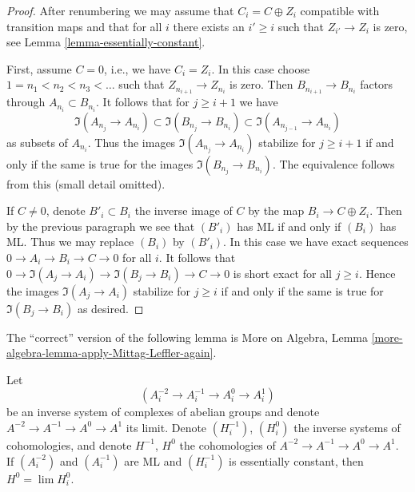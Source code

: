 \begin{proof}
After renumbering we may assume that $C_i = C \oplus Z_i$ compatible with
transition maps and that for all $i$ there exists an $i' \geq i$ such that
$Z_{i'} \to Z_i$ is zero, see Lemma \ref{lemma-essentially-constant}.

\medskip\noindent
First, assume $C = 0$, i.e., we have $C_i = Z_i$.
In this case choose $1 = n_1 < n_2 < n_3 < \ldots$
such that $Z_{n_{i + 1}} \to Z_{n_i}$ is zero.
Then $B_{n_{i + 1}} \to B_{n_i}$ factors through $A_{n_i} \subset B_{n_i}$.
It follows that for $j \geq i + 1$ we have
$$
\Im(A_{n_j} \to A_{n_i}) \subset \Im(B_{n_j} \to B_{n_i}) \subset
\Im(A_{n_{j - 1}} \to A_{n_i})
$$
as subsets of $A_{n_i}$.
Thus the images $\Im(A_{n_j} \to A_{n_i})$ stabilize for $j \geq i + 1$
if and only if the same is true for the images $\Im(B_{n_j} \to B_{n_i})$.
The equivalence follows from this (small detail omitted).

\medskip\noindent
If $C \not = 0$, denote $B'_i \subset B_i$ the inverse image
of $C$ by the map $B_i \to C \oplus Z_i$. Then by the previous
paragraph we see that $(B'_i)$ has ML if and only if $(B_i)$
has ML. Thus we may replace $(B_i)$ by $(B'_i)$.
In this case we have exact sequences $0 \to A_i \to B_i \to C \to 0$
for all $i$. It follows that
$0 \to \Im(A_j \to A_i) \to \Im(B_j \to B_i) \to C \to 0$
is short exact for all $j \geq i$. Hence the images
$\Im(A_j \to A_i)$ stabilize for $j \geq i$
if and only if the same is true for $\Im(B_j \to B_i)$
as desired.
\end{proof}

\noindent
The ``correct'' version of the following lemma is
More on Algebra, Lemma \ref{more-algebra-lemma-apply-Mittag-Leffler-again}.

\begin{lemma}
\label{lemma-apply-Mittag-Leffler-again}
Let
$$
(A^{-2}_i \to A^{-1}_i \to A^0_i \to A^1_i)
$$
be an inverse system of complexes of abelian groups and denote
$A^{-2} \to A^{-1} \to A^0 \to A^1$ its limit. Denote
$(H_i^{-1})$, $(H_i^0)$ the inverse systems of cohomologies, and
denote $H^{-1}$, $H^0$ the cohomologies of $A^{-2} \to A^{-1} \to A^0 \to A^1$.
If $(A^{-2}_i)$ and $(A^{-1}_i)$ are ML and
$(H^{-1}_i)$ is essentially constant, then
$H^0 = \lim H_i^0$.
\end{lemma}

